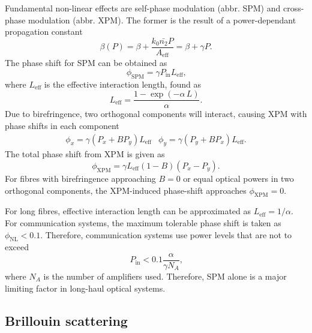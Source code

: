 \documentclass{standalone}
\begin{document}
Fundamental non-linear effects are self-phase modulation (abbr. SPM) and cross-phase modulation (abbr. XPM). The former is the result of a power-dependant propagation constant
\begin{equation}
\beta(P) = \beta + \frac{k_0 \bar{n_2} P}{A_\textrm{eff}} = \beta + \gamma P \textrm{.}
\end{equation}
The phase shift for SPM can be obtained as
\begin{equation}
\phi_\textrm{SPM} = \gamma P_\textrm{in} L_\textrm{eff} \textrm{,}
\end{equation}
where $L_\textrm{eff}$ is the effective interaction length, found as
\begin{equation}
L_\textrm{eff} = \frac{1 - \exp\left(-\alpha \, L\right)}{\alpha} \textrm{.}
\end{equation}
Due to birefringence, two orthogonal components will interact, causing XPM with phase shifts in each component
\begin{eqnarray}
\phi_x = \gamma \left(P_x + B P_y\right) L_\textrm{eff} & \phi_y = \gamma \left( P_y + B P_x \right) L_\textrm{eff} \textrm{.}
\end{eqnarray}
The total phase shift from XPM is given as
\begin{equation}
\phi_\textrm{XPM} = \gamma L_\textrm{eff} \left(1 - B\right) \left(P_x - P_y\right) \textrm{.}
\end{equation}
For fibres with birefringence approaching $B=0$ or equal optical powers in two orthogonal components, the XPM-induced phase-shift approaches $\phi_\textrm{XPM} = 0$.

For long fibres, effective interaction length can be approximated as $L_\textrm{eff} = 1/\alpha$. For communication systems, the maximum tolerable phase shift is taken as $\phi_\textrm{NL} < 0.1$. Therefore, communication systems use power levels that are not to exceed
\begin{equation}
P_\textrm{in} < 0.1 \frac{\alpha}{\gamma N_A} \textrm{,}
\end{equation}
where $N_A$ is the number of amplifiers used. Therefore, SPM alone is a major limiting factor in long-haul optical systems.


\subsection{Brillouin scattering}
\end{document}
